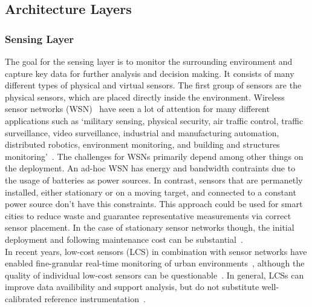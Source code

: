 
\subsection{Architecture Layers}

\subsubsection{Sensing Layer}


The goal for the sensing layer is to monitor the surrounding environment and capture key data for further analysis and decision making. It consists of many different types of physical and virtual sensors. The first group of sensors are the physical sensors, which are placed directly inside the environment. Wireless sensor networks (WSN)~\cite{dargie2010fundamentals} have seen a lot of attention for many different applications such as `military sensing, physical security, air traffic control, traffic surveillance, video surveillance, industrial and manufacturing automation, distributed robotics, environment monitoring, and building and structures monitoring'~\cite{chong2003sensor}. The challenges for WSNs primarily depend among other things on the deployment. An ad-hoc WSN has energy and bandwidth contraints due to the usage of batteries as power sources.
In contrast, sensors that are permanetly installed, either stationary or on a moving target, and connected to a constant power source don't have this constraints. This approach could be used for smart cities to reduce waste and guarantee representative measurements via correct sensor placement. In the case of stationary sensor networks though, the initial deployment and following maintenance cost can be substantial~\cite{chapman2015birmingham}.\\
In recent years, low-cost sensors (LCS) in combination with sensor networks have enabled fine-granular real-time monitoring of urban environments~\cite{grimmond2006progress, rundel2009environmental}, although the quality of individual low-cost sensors can be questionable~\cite{castell2017can}. In general, LCSs can improve data availibility and support analysis, but do not substitute well-calibrated reference instrumentation~\cite{lewis2018low}.

